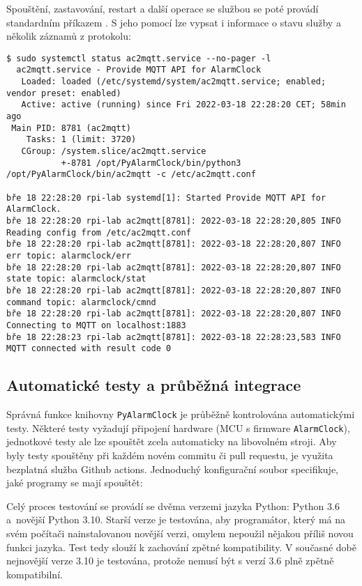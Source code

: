 Spouštění, zastavování, restart a další operace se službou se poté provádí
standardním příkazem . S jeho pomocí lze vypsat i informace
o stavu služby a několik záznamů z protokolu:
\begin{lstlisting}[style=terminal]
$ sudo systemctl status ac2mqtt.service --no-pager -l
  ac2mqtt.service - Provide MQTT API for AlarmClock
   Loaded: loaded (/etc/systemd/system/ac2mqtt.service; enabled; vendor preset: enabled)
   Active: active (running) since Fri 2022-03-18 22:28:20 CET; 58min ago
 Main PID: 8781 (ac2mqtt)
    Tasks: 1 (limit: 3720)
   CGroup: /system.slice/ac2mqtt.service
           +-8781 /opt/PyAlarmClock/bin/python3 /opt/PyAlarmClock/bin/ac2mqtt -c /etc/ac2mqtt.conf

bře 18 22:28:20 rpi-lab systemd[1]: Started Provide MQTT API for AlarmClock.
bře 18 22:28:20 rpi-lab ac2mqtt[8781]: 2022-03-18 22:28:20,805 INFO Reading config from /etc/ac2mqtt.conf
bře 18 22:28:20 rpi-lab ac2mqtt[8781]: 2022-03-18 22:28:20,807 INFO err topic: alarmclock/err
bře 18 22:28:20 rpi-lab ac2mqtt[8781]: 2022-03-18 22:28:20,807 INFO state topic: alarmclock/stat
bře 18 22:28:20 rpi-lab ac2mqtt[8781]: 2022-03-18 22:28:20,807 INFO command topic: alarmclock/cmnd
bře 18 22:28:20 rpi-lab ac2mqtt[8781]: 2022-03-18 22:28:20,807 INFO Connecting to MQTT on localhost:1883
bře 18 22:28:23 rpi-lab ac2mqtt[8781]: 2022-03-18 22:28:23,583 INFO MQTT connected with result code 0
\end{lstlisting}


\subsection{Automatické testy a průběžná integrace}
Správná funkce knihovny \texttt{PyAlarmClock} je průběžně kontrolována
automatickými testy. Některé testy vyžadují připojení hardware (\acs{MCU}
s firmware \texttt{AlarmClock}), jednotkové testy ale lze spouštět zcela
automaticky na libovolném stroji. Aby byly testy spouštěny při každém novém
commitu či pull requestu, je využita bezplatná služba Github actions.
Jednoduchý konfigurační soubor  specifikuje,
jaké programy se mají spouštět:

Celý proces testování se provádí se dvěma verzemi jazyka Python: Python 3.6
a~novější Python 3.10. Starší verze je testována, aby programátor, který má na
svém počítači nainstalovanou novější verzi, omylem nepoužil nějakou příliš
novou funkci jazyka. Test tedy slouží k zachování zpětné kompatibility.
V současné době nejnovější verze 3.10 je testována, protože nemusí být s verzí
3.6 plně zpětně kompatibilní.

